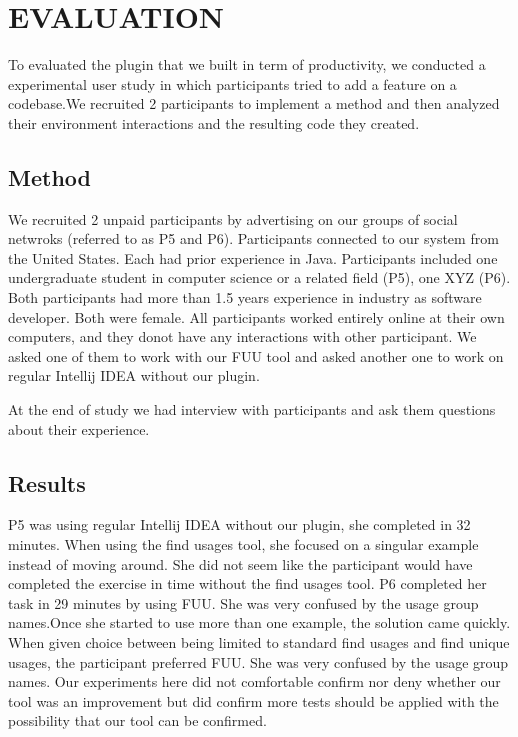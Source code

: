\documentclass[conference]{IEEEtran}
\begin{document}


\section{EVALUATION}
To evaluated the plugin that we built in term of productivity, we conducted a experimental user study in which participants tried to add a feature on a codebase.We recruited 2 participants to implement a method and then analyzed their environment interactions and the resulting code they created. 
\subsection{Method}
We recruited 2 unpaid participants by advertising on our groups of social netwroks (referred to as P5 and P6). Participants connected to our system from the United States. Each had prior experience in Java. Participants included one undergraduate student in computer science or a related field (P5),  one  XYZ  (P6). Both participants had more than 1.5 years experience in industry as software developer. Both were female. All participants worked entirely online at their own computers, and they donot have any interactions with other participant. We asked one of them to work with our FUU tool and asked another one to work on regular Intellij IDEA without our plugin. 

At the end of study we had interview with participants and ask them questions about their experience.
\subsection{Results}
P5 was using regular Intellij IDEA without our plugin, she completed in 32 minutes. When using the find usages tool, she focused on a singular example instead of moving around. She did not seem like the participant would have completed the exercise in time without the find usages tool.
P6 completed her task in 29 minutes by using FUU. She was very confused by the usage group names.Once she started to use more than one example, the solution came quickly. When given choice between being limited to standard find usages and find unique usages, the participant preferred FUU. She was very confused by the usage group names.
Our experiments here did not comfortable confirm nor deny whether our tool was an improvement but did confirm more tests should be applied with the possibility that our tool can be confirmed.
\end{document}
